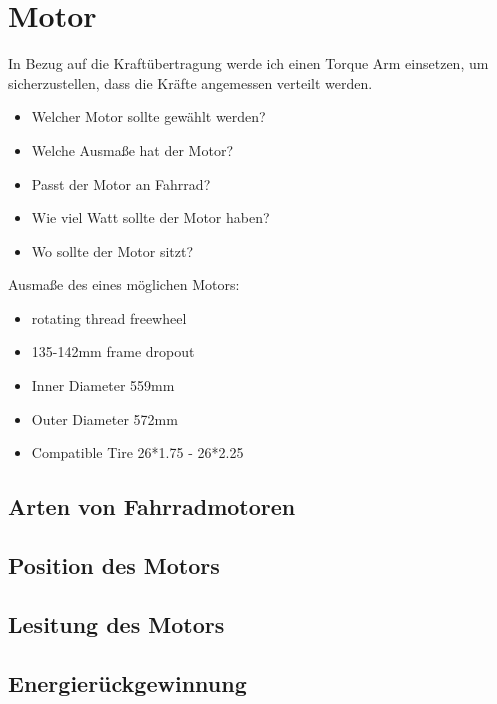 \chapter{Motor}
In Bezug auf die Kraftübertragung werde ich einen Torque Arm einsetzen, um sicherzustellen, dass die Kräfte angemessen verteilt werden.
\begin{itemize}
    \item Welcher Motor sollte gewählt werden?
    \item Welche Ausmaße hat der Motor?
    \item Passt der Motor an Fahrrad?
    \item Wie viel Watt sollte der Motor haben?
    \item Wo sollte der Motor sitzt?
\end{itemize}


Ausmaße des eines möglichen Motors:
\begin{itemize}
    \item rotating thread freewheel
    \item 135-142mm frame dropout
    \item Inner Diameter 559mm
    \item Outer Diameter 572mm
    \item Compatible Tire 26*1.75 - 26*2.25
\end{itemize}
\section{Arten von Fahrradmotoren}
\section{Position des Motors}
\section{Lesitung des Motors}





\section{Energierückgewinnung}




